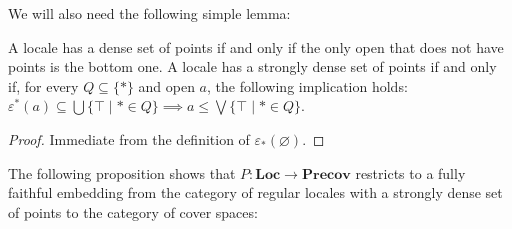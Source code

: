 \documentclass[reqno]{amsart}
\theoremstyle{definition}
\theoremstyle{remark}
\numberwithin{figure}{section}
\newcommand{\cat}[1]{\mathbf{#1}}
\begin{document}
We will also need the following simple lemma:

\begin{lem}
A locale has a dense set of points if and only if the only open that does not have points is the bottom one.
A locale has a strongly dense set of points if and only if, for every $Q \subseteq \{ * \}$ and open $a$, the following implication holds: $\varepsilon^*(a) \subseteq \bigcup \{ \top \mid * \in Q \} \implies a \leq \bigvee \{ \top \mid * \in Q \}$.
\end{lem}
\begin{proof}
Immediate from the definition of $\varepsilon_*(\varnothing)$.
\end{proof}

The following proposition shows that $P : \cat{Loc} \to \cat{Precov}$ restricts to a fully faithful embedding from the category of regular locales with a strongly dense set of points to the category of cover spaces:
\end{document}
